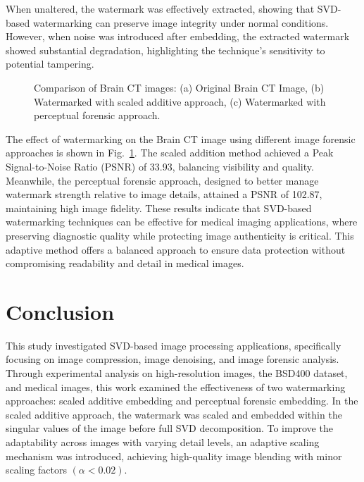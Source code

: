 \documentclass[
  journal,
]{IEEEtran}%
\begin{document}
When unaltered, the watermark was effectively extracted, showing that
SVD-based watermarking can preserve image integrity under normal
conditions. However, when noise was introduced after embedding, the
extracted watermark showed substantial degradation, highlighting the
technique's sensitivity to potential tampering.

\begin{figure}


\caption{\label{fig-BrainCTPerceptualWM}Comparison of Brain CT images:
(a) Original Brain CT Image, (b) Watermarked with scaled additive
approach, (c) Watermarked with perceptual forensic approach.}

\end{figure}%

The effect of watermarking on the Brain CT image using different image
forensic approaches is shown in Fig.~\ref{fig-BrainCTPerceptualWM}. The
scaled addition method achieved a Peak Signal-to-Noise Ratio (PSNR) of
33.93, balancing visibility and quality. Meanwhile, the perceptual
forensic approach, designed to better manage watermark strength relative
to image details, attained a PSNR of 102.87, maintaining high image
fidelity. These results indicate that SVD-based watermarking techniques
can be effective for medical imaging applications, where preserving
diagnostic quality while protecting image authenticity is critical. This
adaptive method offers a balanced approach to ensure data protection
without compromising readability and detail in medical images.

\section{Conclusion}\label{conclusion}

This study investigated SVD-based image processing applications,
specifically focusing on image compression, image denoising, and image
forensic analysis. Through experimental analysis on high-resolution
images, the BSD400 dataset, and medical images, this work examined the
effectiveness of two watermarking approaches: scaled additive embedding
and perceptual forensic embedding. In the scaled additive approach, the
watermark was scaled and embedded within the singular values of the
image before full SVD decomposition. To improve the adaptability across
images with varying detail levels, an adaptive scaling mechanism was
introduced, achieving high-quality image blending with minor scaling
factors \((\alpha < 0.02)\).
\end{document}

